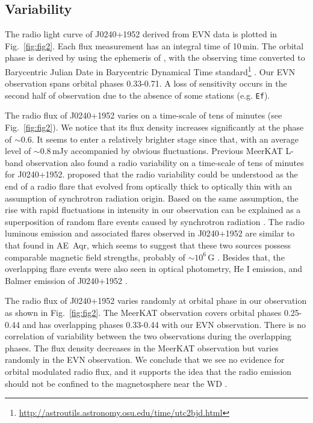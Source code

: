\documentclass[fleqn,usenatbib]{mnras}
\begin{document}
\subsection{Variability}

The radio light curve of J0240+1952 derived from EVN data is plotted in Fig.~\ref{fig:fig2}. Each flux measurement has an integral time of 10\,min. The orbital phase is derived by using the ephemeris of \citet{Garnavich2021}, with the observing time converted to Barycentric Julian Date in Barycentric Dynamical Time standard\footnote{\url{http://astroutils.astronomy.osu.edu/time/utc2bjd.html}} \citep{Eastman2010}. Our EVN observation spans orbital phases 0.33-0.71. A loss of sensitivity occurs in the second half of observation due to the absence of some stations (e.g. \texttt{Ef}). 

The radio flux of J0240+1952 varies on a time-scale of tens of minutes (see Fig.~\ref{fig:fig2}). We notice that its flux density increases significantly at the phase of $\sim0.6$. It seems to enter a relatively brighter stage since that, with an average level of $\sim0.8$\,mJy accompanied by obvious fluctuations. Previous MeerKAT L-band observation \citep{Pretorius2021} also found a radio variability on a time-scale of tens of minutes for J0240+1952. \citet{Pretorius2021} proposed that the radio variability could be understood as the end of a radio flare that evolved from optically thick to optically thin with an assumption of synchrotron radiation origin. Based on the same assumption, the rise with rapid fluctuations in intensity in our observation can be explained as a superposition of random flare events caused by synchrotron radiation \citep{Bastian1988}. The radio luminous emission and associated flares observed in J0240+1952 are similar to that found in AE~Aqr, which seems to suggest that these two sources possess comparable magnetic field strengths, probably of $\sim10^6$\,G \citep{Lyutikov2020}. Besides that, the overlapping flare events were also seen in optical photometry, He I emission, and Balmer emission of J0240+1952 \citep{Garnavich2021}. 

The radio flux of J0240+1952 varies randomly at orbital phase in our observation as shown in Fig.~\ref{fig:fig2}. The MeerKAT observation covers orbital phases 0.25-0.44 \citep{Pretorius2021} and has overlapping phases 0.33-0.44 with our EVN observation. There is no correlation of variability between the two observations during the overlapping phases. The flux density decreases in the MeerKAT observation but varies randomly in the EVN observation. We conclude that we see no evidence for orbital modulated radio flux, and it supports the idea that the radio emission should not be confined to the magnetosphere near the WD \citep{Barrett2022}.  
\end{document}
